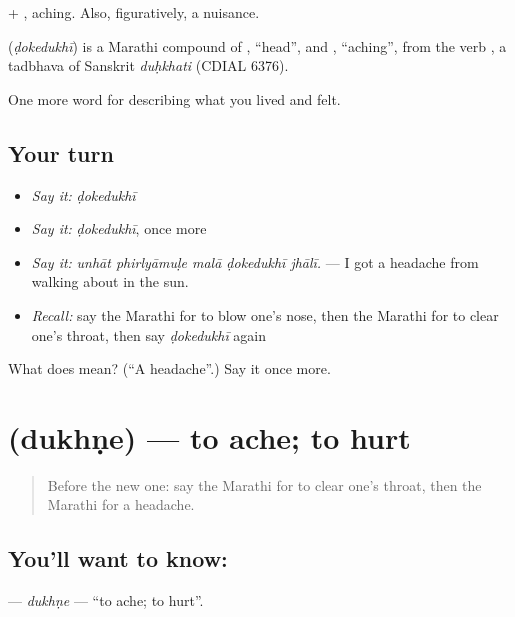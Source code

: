  + , aching. Also, figuratively, a nuisance.

\begin{cousinweb}
\textbf{} (\emph{ḍokedukhī}) is a Marathi compound of , \textquotedblleft{}head\textquotedblright{}, and , \textquotedblleft{}aching\textquotedblright{}, from the verb , a tadbhava of Sanskrit \emph{duḥkhati} (CDIAL 6376).
\end{cousinweb}

\begin{grammarlens}[title={What you've built}]
One more word for describing what you lived and felt.
\end{grammarlens}

\subsection*{Your turn}
\begin{itemize}
\raggedright
  \item \emph{Say it:} \emph{ḍokedukhī}
  \item \emph{Say it:} \emph{ḍokedukhī}, once more
  \item \emph{Say it:} \emph{unhāt phirlyāmuḷe malā ḍokedukhī jhālī.} — I got a headache from walking about in the sun.
  \item \emph{Recall:} say the Marathi for to blow one's nose, then the Marathi for to clear one's throat, then say \emph{ḍokedukhī} again
\end{itemize}

\begin{tcolorbox}[breakable,colback=teal!4,colframe=teal!35!black,title={Before you move on}]
What does  mean? (\textquotedblleft{}A headache\textquotedblright{}.) Say it once more.
\end{tcolorbox}
\section[\texorpdfstring{\mr{दुखणे} (dukhṇe)}{दुखणे (dukhṇe)}]{ (dukhṇe) — to ache; to hurt}

\label{lesson:MR-C482-dukhne}



\begin{quote}
Before the new one: say the Marathi for to clear one's throat, then the Marathi for a headache.
\end{quote}

\subsection*{You'll want to know: }
\textbf{} — \emph{dukhṇe} — \textquotedblleft{}to ache; to hurt\textquotedblright{}.

